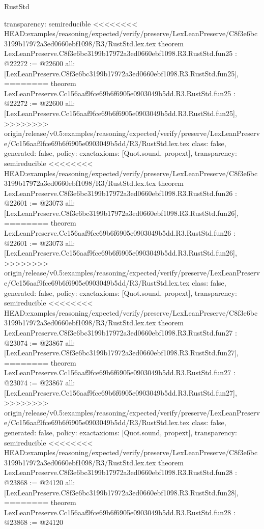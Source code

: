 \begin{lexlean}{RustStd}
\begin{coremodule}
{\begin{coremodule}
{{{{{{{{{{{{{{{{{{{{{{{{{{{{  transparency: semireducible
}
<<<<<<<< HEAD:examples/reasoning/expected/verify/preserve/LexLeanPreserve/C8f3e6bc3199b17972a3ed0660ebf1098/R3/RustStd.lex.tex
theorem LexLeanPreserve.C8f3e6bc3199b17972a3ed0660ebf1098.R3.RustStd.fun25 : @22272 := @22600 {
  all: [LexLeanPreserve.C8f3e6bc3199b17972a3ed0660ebf1098.R3.RustStd.fun25],
========
theorem LexLeanPreserve.Cc156aaf9fce69b6f6905e0903049b5dd.R3.RustStd.fun25 : @22272 := @22600 {
  all: [LexLeanPreserve.Cc156aaf9fce69b6f6905e0903049b5dd.R3.RustStd.fun25],
>>>>>>>> origin/release/v0.5:examples/reasoning/expected/verify/preserve/LexLeanPreserve/Cc156aaf9fce69b6f6905e0903049b5dd/R3/RustStd.lex.tex
  class: false,
  generated: false,
  policy: exact{axioms: [Quot.sound, propext]},
  transparency: semireducible
}
<<<<<<<< HEAD:examples/reasoning/expected/verify/preserve/LexLeanPreserve/C8f3e6bc3199b17972a3ed0660ebf1098/R3/RustStd.lex.tex
theorem LexLeanPreserve.C8f3e6bc3199b17972a3ed0660ebf1098.R3.RustStd.fun26 : @22601 := @23073 {
  all: [LexLeanPreserve.C8f3e6bc3199b17972a3ed0660ebf1098.R3.RustStd.fun26],
========
theorem LexLeanPreserve.Cc156aaf9fce69b6f6905e0903049b5dd.R3.RustStd.fun26 : @22601 := @23073 {
  all: [LexLeanPreserve.Cc156aaf9fce69b6f6905e0903049b5dd.R3.RustStd.fun26],
>>>>>>>> origin/release/v0.5:examples/reasoning/expected/verify/preserve/LexLeanPreserve/Cc156aaf9fce69b6f6905e0903049b5dd/R3/RustStd.lex.tex
  class: false,
  generated: false,
  policy: exact{axioms: [Quot.sound, propext]},
  transparency: semireducible
}
<<<<<<<< HEAD:examples/reasoning/expected/verify/preserve/LexLeanPreserve/C8f3e6bc3199b17972a3ed0660ebf1098/R3/RustStd.lex.tex
theorem LexLeanPreserve.C8f3e6bc3199b17972a3ed0660ebf1098.R3.RustStd.fun27 : @23074 := @23867 {
  all: [LexLeanPreserve.C8f3e6bc3199b17972a3ed0660ebf1098.R3.RustStd.fun27],
========
theorem LexLeanPreserve.Cc156aaf9fce69b6f6905e0903049b5dd.R3.RustStd.fun27 : @23074 := @23867 {
  all: [LexLeanPreserve.Cc156aaf9fce69b6f6905e0903049b5dd.R3.RustStd.fun27],
>>>>>>>> origin/release/v0.5:examples/reasoning/expected/verify/preserve/LexLeanPreserve/Cc156aaf9fce69b6f6905e0903049b5dd/R3/RustStd.lex.tex
  class: false,
  generated: false,
  policy: exact{axioms: [Quot.sound, propext]},
  transparency: semireducible
}
<<<<<<<< HEAD:examples/reasoning/expected/verify/preserve/LexLeanPreserve/C8f3e6bc3199b17972a3ed0660ebf1098/R3/RustStd.lex.tex
theorem LexLeanPreserve.C8f3e6bc3199b17972a3ed0660ebf1098.R3.RustStd.fun28 : @23868 := @24120 {
  all: [LexLeanPreserve.C8f3e6bc3199b17972a3ed0660ebf1098.R3.RustStd.fun28],
========
theorem LexLeanPreserve.Cc156aaf9fce69b6f6905e0903049b5dd.R3.RustStd.fun28 : @23868 := @24120 {
}}}}}}}}}}}}}}}}}}}}}}}}}}}}}}}}
\end{coremodule}}
\end{coremodule}
\end{lexlean}
